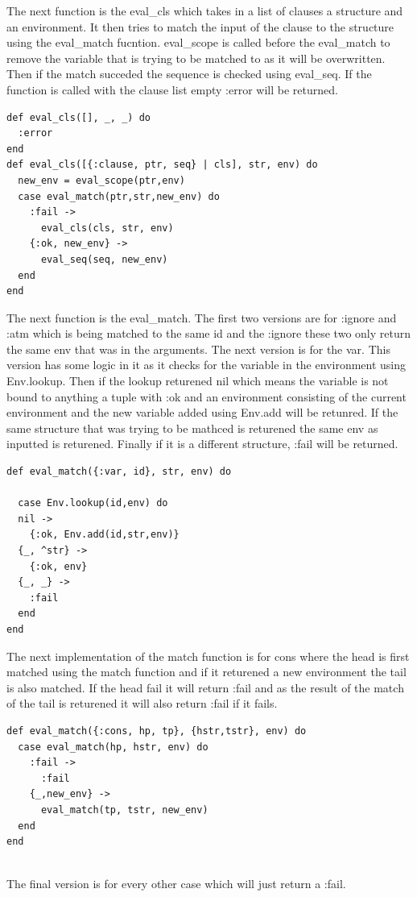 \documentclass[a4paper,11pt]{article}
\begin{document}
The next function is the eval\_cls which takes in a list of clauses a structure and an environment. It then tries to match the input of the clause to the structure using the eval\_match fucntion. eval\_scope is called before the eval\_match to remove the variable that is trying to be matched to as it will be overwritten. 
Then if the match succeded the sequence is checked using eval\_seq. If the function is called with the clause list empty :error will be returned. 
\begin{verbatim}
def eval_cls([], _, _) do
  :error
end
def eval_cls([{:clause, ptr, seq} | cls], str, env) do
  new_env = eval_scope(ptr,env)
  case eval_match(ptr,str,new_env) do
    :fail ->
      eval_cls(cls, str, env)
    {:ok, new_env} ->
      eval_seq(seq, new_env)
  end
end
\end{verbatim}
The next function is the eval\_match. The first two versions are for :ignore and :atm which is being matched to the same id and the :ignore these two only return the same env that was in the arguments. 
The next version is for the var. This version has some logic in it as it checks for the variable in the environment using Env.lookup. Then if the lookup returened nil which means the variable is not bound to anything a tuple with :ok and an environment consisting of the current environment and the new variable added using Env.add will be retunred. If the same structure that was trying to be mathced is returened the same env as inputted is returened. 
Finally if it is a different structure, :fail will be returned.
\begin{verbatim}
def eval_match({:var, id}, str, env) do

  case Env.lookup(id,env) do
  nil ->
    {:ok, Env.add(id,str,env)}
  {_, ^str} ->
    {:ok, env}
  {_, _} ->
    :fail
  end
end

\end{verbatim}
The next implementation of the match function is for cons where the head is first matched using the match function and if it returened a new environment the tail is also matched. If the head fail it will return :fail and as the result of the match of the tail is returened it will also return :fail if it fails. 
\begin{verbatim}
def eval_match({:cons, hp, tp}, {hstr,tstr}, env) do
  case eval_match(hp, hstr, env) do
    :fail ->
      :fail
    {_,new_env} ->
      eval_match(tp, tstr, new_env)
  end
end
  
\end{verbatim}
The final version is for every other case which will just return a :fail.
\end{document}
